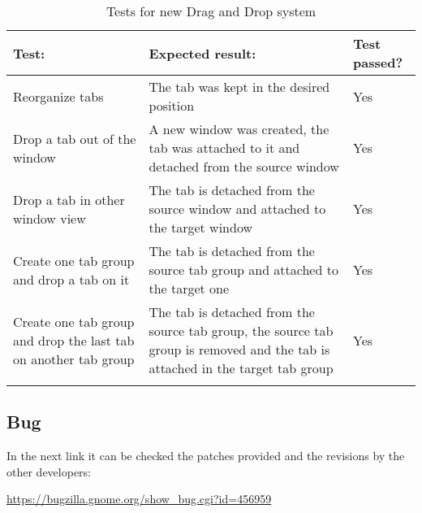 \begin{table}[H]
  \begin{center}
    \begin{tabularx}{\textwidth}{|X|X|l|}
      \firsthline
      \textbf{Test:} & \textbf{Expected result:} & \textbf{Test passed?} \\
      \hline
      Reorganize tabs & The tab was kept in the desired position & Yes \\
      \hline
      Drop a tab out of the window & A new window was created, the tab was attached to it and detached from the source window & Yes \\
      \hline
      Drop a tab in other window view & The tab is detached from the source window and attached to the target window & Yes \\
      \hline
      Create one tab group and drop a tab on it & The tab is detached from the source tab group and attached to the target one & Yes \\
      \hline
      Create one tab group and drop the last tab on another tab group & The tab is detached from the source tab group, the source tab group is removed and the tab is attached in the target tab group & Yes \\
      \lasthline
    \end{tabularx}
    \caption{Tests for new Drag and Drop system}
  \end{center}
\end{table}

\subsection{Bug}

In the next link it can be checked the patches provided and the revisions by the other developers:

\noindent\url{https://bugzilla.gnome.org/show_bug.cgi?id=456959}
